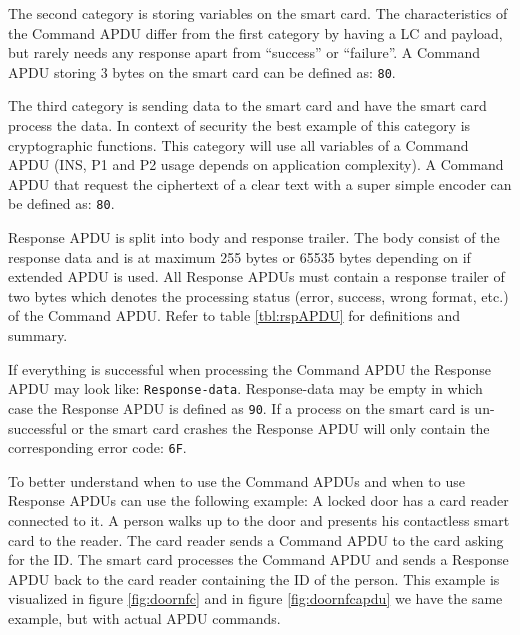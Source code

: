 The second category is storing variables on the smart card. The characteristics of the Command APDU differ from the first category by having a LC and payload, but rarely needs any response apart from ``success'' or ``failure''. A Command APDU storing 3 bytes on the smart card can be defined as: \texttt{80}.

The third category is sending data to the smart card and have the smart card process the data. In context of security the best example of this category is cryptographic functions. This category will use all variables of a Command APDU (INS, P1 and P2 usage depends on application complexity). A Command APDU that request the ciphertext of a clear text with a super simple encoder can be defined as: \texttt{80}.

Response APDU is split into body and response trailer. The body consist of the response data and is at maximum 255 bytes or 65535 bytes depending on if extended APDU is used. All Response APDUs must contain a response trailer of two bytes which denotes the processing status (error, success, wrong format, etc.) of the Command APDU. Refer to table \ref{tbl:rspAPDU} for definitions and summary.


If everything is successful when processing the Command APDU the Response APDU may look like: \texttt{Response-data}. Response-data may be empty in which case the Response APDU is defined as \texttt{90}. If a process on the smart card is un-successful or the smart card crashes the Response APDU will only contain the corresponding error code: \texttt{6F}.

To better understand when to use the Command APDUs and when to use Response APDUs can use the following example: A locked door has a card reader connected to it. A person walks up to the door and presents his contactless smart card to the reader. The card reader sends a Command APDU to the card asking for the ID. The smart card processes the Command APDU and sends a Response APDU back to the card reader containing the ID of the person. This example is visualized in figure \ref{fig:doornfc} and in figure \ref{fig:doornfcapdu} we have the same example, but with actual APDU commands.

